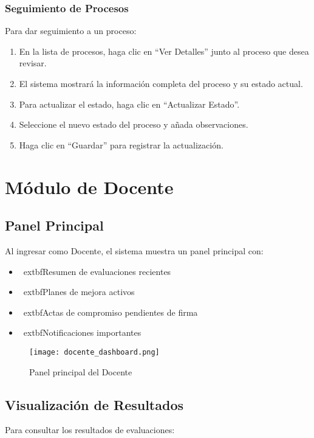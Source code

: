\documentclass[12pt,a4paper]{book}
\begin{document}
\subsection{Seguimiento de Procesos}
Para dar seguimiento a un proceso:

\begin{enumerate}
    \item En la lista de procesos, haga clic en ``Ver Detalles'' junto al proceso que desea revisar.
    \item El sistema mostrará la información completa del proceso y su estado actual.
    \item Para actualizar el estado, haga clic en ``Actualizar Estado''.
    \item Seleccione el nuevo estado del proceso y añada observaciones.
    \item Haga clic en ``Guardar'' para registrar la actualización.
\end{enumerate}

\chapter{Módulo de Docente}
\section{Panel Principal}
Al ingresar como Docente, el sistema muestra un panel principal con:

\begin{itemize}
    \item \	extbf{Resumen de evaluaciones} recientes
    \item \	extbf{Planes de mejora} activos
    \item \	extbf{Actas de compromiso} pendientes de firma
    \item \	extbf{Notificaciones} importantes
\end{itemize}

\begin{figure}[H]
    \centering
    \texttt{[image: docente\_dashboard.png]}
    \caption{Panel principal del Docente}
    \label{fig:docente_dashboard}
\end{figure}

\section{Visualización de Resultados}
Para consultar los resultados de evaluaciones:
\end{document}

